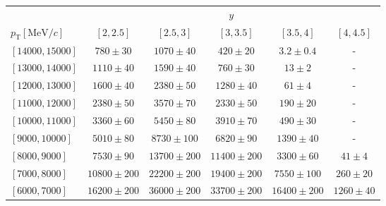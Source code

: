 \renewcommand{\arraystretch}{1.0}
\begin{tabular}{lr@{\hskip+0.2em}c@{\hskip+0.2em}r@{\hskip+0.2em}c@{\hskip+0.2em}rr@{\hskip+0.2em}c@{\hskip+0.2em}r@{\hskip+0.2em}c@{\hskip+0.2em}rr@{\hskip+0.2em}c@{\hskip+0.2em}r@{\hskip+0.2em}c@{\hskip+0.2em}rr@{\hskip+0.2em}c@{\hskip+0.2em}r@{\hskip+0.2em}c@{\hskip+0.2em}rr@{\hskip+0.2em}c@{\hskip+0.2em}r@{\hskip+0.2em}c@{\hskip+0.2em}r}
\toprule&\multicolumn{25}{c}{$y$}\\
$p_{\text{T}} [\text{MeV}/c]$ & \multicolumn{5}{c}{$[2,2.5]$} & \multicolumn{5}{c}{$[2.5,3]$} & \multicolumn{5}{c}{$[3,3.5]$} & \multicolumn{5}{c}{$[3.5,4]$} & \multicolumn{5}{c}{$[4,4.5]$} \\
\midrule$[14000,15000]$ & \multicolumn{5}{c}{$780 \pm 30$} & \multicolumn{5}{c}{$1070 \pm 40$} & \multicolumn{5}{c}{$420 \pm 20$} & \multicolumn{5}{c}{$3.2 \pm 0.4$} & \multicolumn{5}{c}{-} \\
$[13000,14000]$ & \multicolumn{5}{c}{$1110 \pm 40$} & \multicolumn{5}{c}{$1590 \pm 40$} & \multicolumn{5}{c}{$760 \pm 30$} & \multicolumn{5}{c}{$13 \pm 2$} & \multicolumn{5}{c}{-} \\
$[12000,13000]$ & \multicolumn{5}{c}{$1600 \pm 40$} & \multicolumn{5}{c}{$2380 \pm 50$} & \multicolumn{5}{c}{$1280 \pm 40$} & \multicolumn{5}{c}{$61 \pm 4$} & \multicolumn{5}{c}{-} \\
$[11000,12000]$ & \multicolumn{5}{c}{$2380 \pm 50$} & \multicolumn{5}{c}{$3570 \pm 70$} & \multicolumn{5}{c}{$2330 \pm 50$} & \multicolumn{5}{c}{$190 \pm 20$} & \multicolumn{5}{c}{-} \\
$[10000,11000]$ & \multicolumn{5}{c}{$3360 \pm 60$} & \multicolumn{5}{c}{$5450 \pm 80$} & \multicolumn{5}{c}{$3910 \pm 70$} & \multicolumn{5}{c}{$490 \pm 30$} & \multicolumn{5}{c}{-} \\
$[9000,10000]$ & \multicolumn{5}{c}{$5010 \pm 80$} & \multicolumn{5}{c}{$8730 \pm 100$} & \multicolumn{5}{c}{$6820 \pm 90$} & \multicolumn{5}{c}{$1390 \pm 40$} & \multicolumn{5}{c}{-} \\
$[8000,9000]$ & \multicolumn{5}{c}{$7530 \pm 90$} & \multicolumn{5}{c}{$13700 \pm 200$} & \multicolumn{5}{c}{$11400 \pm 200$} & \multicolumn{5}{c}{$3300 \pm 60$} & \multicolumn{5}{c}{$41 \pm 4$} \\
$[7000,8000]$ & \multicolumn{5}{c}{$10800 \pm 200$} & \multicolumn{5}{c}{$22200 \pm 200$} & \multicolumn{5}{c}{$19400 \pm 200$} & \multicolumn{5}{c}{$7550 \pm 100$} & \multicolumn{5}{c}{$260 \pm 20$} \\
$[6000,7000]$ & \multicolumn{5}{c}{$16200 \pm 200$} & \multicolumn{5}{c}{$36000 \pm 200$} & \multicolumn{5}{c}{$33700 \pm 200$} & \multicolumn{5}{c}{$16400 \pm 200$} & \multicolumn{5}{c}{$1260 \pm 40$} \\

\end{tabular}

